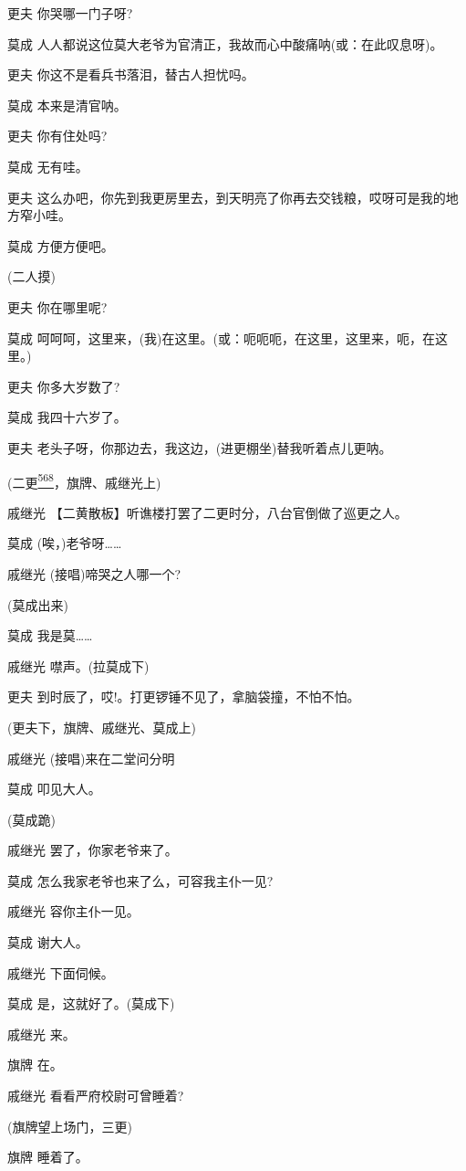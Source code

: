 更夫 你哭哪一门子呀?

莫成 人人都说这位莫大老爷为官清正，我故而心中酸痛呐(或：在此叹息呀)。

更夫 你这不是看兵书落泪，替古人担忧吗。

莫成 本来是清官呐。

更夫 你有住处吗?

莫成 无有哇。

更夫
这么办吧，你先到我更房里去，到天明亮了你再去交钱粮，哎呀可是我的地方窄小哇。

莫成 方便方便吧。

(二人摸)

更夫 你在哪里呢?

莫成
呵呵呵，这里来，(我)在这里。(或：呃呃呃，在这里，这里来，呃，在这里。)

更夫 你多大岁数了?

莫成 我四十六岁了。

更夫 老头子呀，你那边去，我这边，(进更棚坐)替我听着点儿更呐。

(二更\protect\hyperlink{fn568}{\textsuperscript{568}}，旗牌、戚继光上)

戚继光 【二黄散板】听谯楼打罢了二更时分，八台官倒做了巡更之人。

莫成 (唉，)老爷呀\ldots{}\ldots{}

戚继光 (接唱)啼哭之人哪一个?

(莫成出来)

莫成 我是莫\ldots{}\ldots{}

戚继光 噤声。(拉莫成下)

更夫 到时辰了，哎!。打更锣锤不见了，拿脑袋撞，不怕不怕。

(更夫下，旗牌、戚继光、莫成上)

戚继光 (接唱)来在二堂问分明

莫成 叩见大人。

(莫成跪)

戚继光 罢了，你家老爷来了。

莫成 怎么我家老爷也来了么，可容我主仆一见?

戚继光 容你主仆一见。

莫成 谢大人。

戚继光 下面伺候。

莫成 是，这就好了。(莫成下)

戚继光 来。

旗牌 在。

戚继光 看看严府校尉可曾睡着?

(旗牌望上场门，三更)

旗牌 睡着了。

